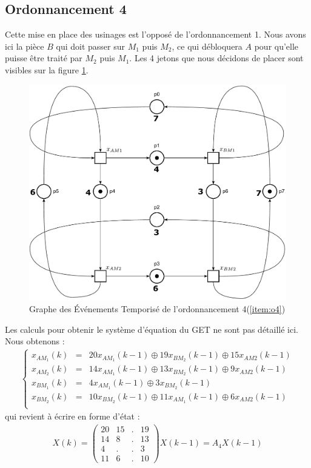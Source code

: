\subsection{Ordonnancement 4}
Cette mise en place des usinages est l'opposé de l'ordonnancement 1. Nous avons ici la pièce $B$ qui doit passer sur $M_1$ puis $M_2$, ce qui débloquera $A$ pour qu'elle puisse être traité par $M_2$ puis $M_1$. Les 4 jetons que nous décidons de placer sont visibles sur la figure \ref{fig:get4}.
\begin{figure}[!ht]
\centering
\includegraphics[width = .75\textwidth]{./II/images/GET_4.pdf}
\caption{\label{fig:get4} Graphe des Événements Temporisé de l'ordonnancement 4(\ref{item:o4})}
\end{figure}

Les calculs pour obtenir le système d'équation du GET ne sont pas détaillé ici. Nous obtenons : 
\begin{align*}%
\left\lbrace
\begin{array}{lcl}
x_{AM_1}(k)&=& 20x_{AM_1}(k-1) \oplus 19x_{BM_2}(k-1) \oplus 15x_{AM2}(k-1)\\
x_{AM_2}(k)&=& 14x_{AM_1}(k-1) \oplus 13x_{BM_2}(k-1) \oplus  9x_{AM2}(k-1)\\
x_{BM_1}(k)&=&  4x_{AM_1}(k-1) \oplus  3x_{BM_2}(k-1)\\
x_{BM_2}(k)&=& 10x_{BM_2}(k-1) \oplus 11x_{AM_1}(k-1) \oplus  6x_{AM2}(k-1)\\
\end{array}
\right.
\end{align*}
qui revient à écrire en forme d'état : 
\begin{align}\label{eqn::ee_Ordo4}
X(k) = \begin{pmatrix}
20 & 15 & . & 19\\
14 & 8  & . & 13\\
4  & .  & . & 3 \\
11 & 6  & . & 10
\end{pmatrix}X(k-1) = A_4X(k-1)
\end{align}

